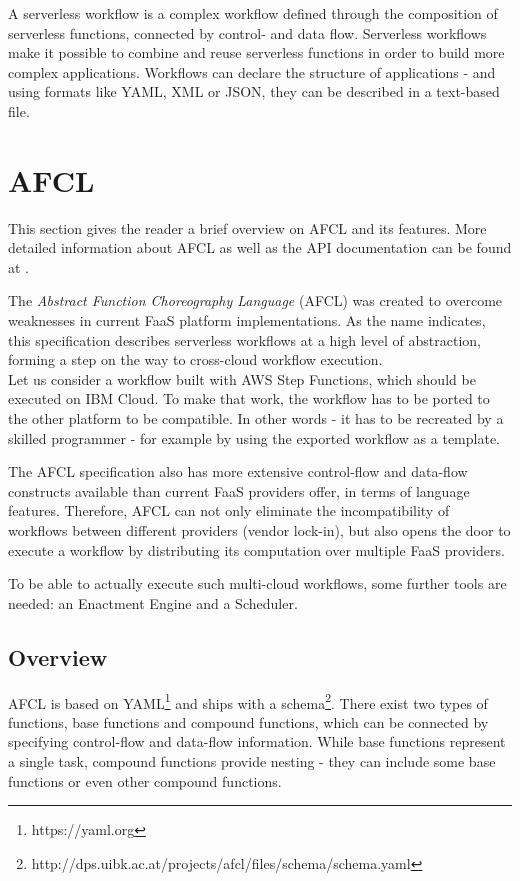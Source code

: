 \documentclass[a4paper,top=25mm,bottom=25mm,12pt,pdftex,halfparskip,twoside,bibtotoc,numbers=noenddot]{scrbook}
\begin{document}
A serverless workflow is a complex workflow defined through the composition of serverless functions, connected by control- and data flow. Serverless workflows make it possible to combine and reuse serverless functions in order to build more complex applications. 
Workflows can declare the structure of applications - and using formats like YAML, XML or JSON, they can be described in a text-based file.

\section{AFCL}

This section gives the reader a brief overview on AFCL and its features. More detailed information about AFCL as well as the API documentation can be found at \cite{online-afcl-dps}.

The \emph{Abstract Function Choreography Language} (AFCL) was created to overcome weaknesses in current FaaS platform implementations. As the name indicates, this specification describes serverless workflows at a high level of abstraction, forming a step on the way to cross-cloud workflow execution.\\
Let us consider a workflow built with AWS Step Functions, which should be executed on IBM Cloud. To make that work, the workflow has to be ported to the other platform to be compatible. In other words - it has to be recreated by a skilled programmer - for example by using the exported workflow as a template.

The AFCL specification also has more extensive control-flow and data-flow constructs available than current FaaS providers offer, in terms of language features. Therefore, AFCL can not only eliminate the incompatibility of workflows between different providers (vendor lock-in), but also opens the door to execute a workflow by distributing its computation over multiple FaaS providers.

To be able to actually execute such multi-cloud workflows, some further tools are needed: an Enactment Engine and a Scheduler.

\subsection{Overview}
AFCL is based on YAML\footnote{https://yaml.org} and ships with a schema\footnote{http://dps.uibk.ac.at/projects/afcl/files/schema/schema.yaml}. There exist two types of functions, base functions and compound functions, which can be connected by specifying control-flow and data-flow information. While base functions represent a single task, compound functions provide nesting - they can include some base functions or even other compound functions.
\end{document}
